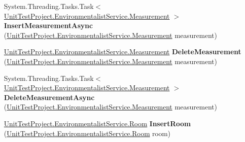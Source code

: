 \begin{DoxyCompactItemize}
\item 
\hypertarget{class_unit_test_project_1_1_environmentalist_service_1_1_service1_client_a3d8c0146a5c745684a37e7f3517cba04}{}System.\+Threading.\+Tasks.\+Task$<$ \hyperlink{class_unit_test_project_1_1_environmentalist_service_1_1_measurement}{Unit\+Test\+Project.\+Environmentalist\+Service.\+Measurement} $>$ {\bfseries Insert\+Measurement\+Async} (\hyperlink{class_unit_test_project_1_1_environmentalist_service_1_1_measurement}{Unit\+Test\+Project.\+Environmentalist\+Service.\+Measurement} measurement)\label{class_unit_test_project_1_1_environmentalist_service_1_1_service1_client_a3d8c0146a5c745684a37e7f3517cba04}

\item 
\hypertarget{class_unit_test_project_1_1_environmentalist_service_1_1_service1_client_ab6e5a7ae1abb6f495cd64ec8d97dc936}{}\hyperlink{class_unit_test_project_1_1_environmentalist_service_1_1_measurement}{Unit\+Test\+Project.\+Environmentalist\+Service.\+Measurement} {\bfseries Delete\+Measurement} (\hyperlink{class_unit_test_project_1_1_environmentalist_service_1_1_measurement}{Unit\+Test\+Project.\+Environmentalist\+Service.\+Measurement} measurement)\label{class_unit_test_project_1_1_environmentalist_service_1_1_service1_client_ab6e5a7ae1abb6f495cd64ec8d97dc936}

\item 
\hypertarget{class_unit_test_project_1_1_environmentalist_service_1_1_service1_client_ade80d9e6773fab52f402d58ffbe8b881}{}System.\+Threading.\+Tasks.\+Task$<$ \hyperlink{class_unit_test_project_1_1_environmentalist_service_1_1_measurement}{Unit\+Test\+Project.\+Environmentalist\+Service.\+Measurement} $>$ {\bfseries Delete\+Measurement\+Async} (\hyperlink{class_unit_test_project_1_1_environmentalist_service_1_1_measurement}{Unit\+Test\+Project.\+Environmentalist\+Service.\+Measurement} measurement)\label{class_unit_test_project_1_1_environmentalist_service_1_1_service1_client_ade80d9e6773fab52f402d58ffbe8b881}

\item 
\hypertarget{class_unit_test_project_1_1_environmentalist_service_1_1_service1_client_a0627370088b6731a50a6ca5805454953}{}\hyperlink{class_unit_test_project_1_1_environmentalist_service_1_1_room}{Unit\+Test\+Project.\+Environmentalist\+Service.\+Room} {\bfseries Insert\+Room} (\hyperlink{class_unit_test_project_1_1_environmentalist_service_1_1_room}{Unit\+Test\+Project.\+Environmentalist\+Service.\+Room} room)\label{class_unit_test_project_1_1_environmentalist_service_1_1_service1_client_a0627370088b6731a50a6ca5805454953}


\end{DoxyCompactItemize}

